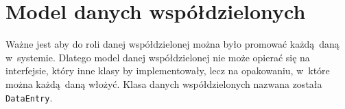 %


\section{Model danych współdzielonych}
Ważne jest aby do roli danej współdzielonej można było promować każdą daną w~systemie. Dlatego model danej współdzielonej nie może opierać się na interfejsie, który inne klasy by implementowały, lecz na opakowaniu, w~które można każdą daną włożyć. Klasa danych współdzielonych nazwana została \lstinline$DataEntry$.

